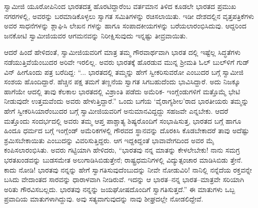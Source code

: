 ಸ್ವಾಮೀಜಿ ಯೂರೋಪಿನಿಂದ ಭಾರತದತ್ತ ಹೊರಟಿದ್ದಾರೆಂಬ ವರ್ತಮಾನ ತಿಳಿದ ಕೂಡಲೇ ಭಾರತದ ಪ್ರಮುಖ ನಗರಗಳಲ್ಲಿ, ಅವರನ್ನು ಬರಮಾಡಿಕೊಳ್ಳಲು ಸ್ವಾಗತ ಸಮಿತಿಗಳನ್ನು ರಚಿಸಲಾಯಿತು. ಇಡೀ ದೇಶದಲ್ಲಿನ ವೃತ್ತಪತ್ರಿಕೆಗಳು ಅವರ ಸಾಧನೆಗಳನ್ನು ಶ್ಲಾಘಿಸಿ ಲೇಖನ ಗಳನ್ನು ಹಾಗೂ ಸಂಪಾದಕೀಯಗಳನ್ನು ಬರೆಯಲಾರಂಭಿಸಿದುವು. ಆದ್ದರಿಂದ ಜನಕೋಟಿ ಸ್ವಾಮೀಜಿಯವರ ಆಗಮನವನ್ನು ನಿರೀಕ್ಷಿಸುವುದು ಇನ್ನಷ್ಟು ತೀವ್ರವಾಯಿತು.

ಆದರೆ ಹಿಂದೆ ಹೇಳಿದಂತೆ, ಸ್ವಾಮೀಜಿಯವರಿಗೆ ಮಾತ್ರ ತಮ್ಮ ಗೌರವಾರ್ಥವಾಗಿ ಭಾರತ ದಲ್ಲಿ ಇಷ್ಟೆಲ್ಲ ಸಿದ್ಧತೆಗಳು ನಡೆಯುತ್ತಿವೆಯೆಂಬುದರ ಅರಿವೇ ಇರಲಿಲ್ಲ. ಅವರು ಭಾರತಕ್ಕೆ ಹೊರಡುವ ಮುನ್ನ ಶ್ರೀಮತಿ ಓಲ್ ಬುಲ್​ಳಿಗೆ ಗುಡ್​ವಿನ್ ಹೀಗೊಂದು ಪತ್ರ ಬರೆದಿದ್ದ: “... ಭಾರತದಲ್ಲಿ ತಮ್ಮನ್ನು ಹೇಗೆ ಸ್ವೀಕರಿಸುವರೋ ಎಂಬುದರ ಬಗ್ಗೆ ಸ್ವಾಮೀಜಿ ಸಂಶಯ ಹೊಂದಿದ್ದಾರೆ. ಹೆಚ್ಚಿನ ಪಕ್ಷ ತಮಗೆ ತಣ್ಣನೆಯ ಸ್ವಾಗತ ಸಿಗಬಹುದೆಂದು ಭಾವಿಸಿದ್ದಾರೆ. ಅದು ನಿಜಕ್ಕೂ ಹಾಗೆಯೇ ಆದಲ್ಲಿ ತಾವು ಕೆಲಕಾಲ ಭಾರತದಲ್ಲಿ ವಿಶ್ರಾಂತಿ ಪಡೆದು ಅಮೆರಿಕ- ಇಂಗ್ಲೆಂಡುಗಳಿಗೆ ಮತ್ತೊಮ್ಮೆ ಭೇಟಿ ನೀಡುವುದೇ ಉತ್ತಮವೆಂದು ಅವರು ಹೇಳುತ್ತಿದ್ದಾರೆ.” ಒಂದು ಬಗೆಯ ‘ವೈರಾಗ್ಯಶೀಲ’ರಾದ ಭಾರತೀಯರು ತಮ್ಮನ್ನು ಹೇಗೆ ಸ್ವೀಕರಿಸಿಯಾರೆಂಬುದರ ಬಗ್ಗೆ ಸ್ವಾಮೀಜಿಯವರಿಗೆ ಅನುಮಾನವಿದ್ದದ್ದು ಸಹಜವೇ ಎನ್ನಬೇಕು. ಆದರೆ ಮತ್ತೊಂದು ಸಂದರ್ಭದಲ್ಲಿ ಅವರು ತಮ್ಮ ಆಪ್ತ ಪಾಶ್ಚಾತ್ಯ ಶಿಷ್ಯರೊಂದಿಗೆ ಸಂಭಾಷಿಸುತ್ತ, ಭಾರತದ ಬಗ್ಗೆ ಹಾಗೂ ಹಿಂದೂ ಧರ್ಮದ ಬಗ್ಗೆ ಇಂಗ್ಲೆಂಡ್ ಅಮೆರಿಕಗಳಲ್ಲಿ ಗೌರವದ ಸ್ಥಾನವನ್ನು ದೊರಕಿಸಿ ಕೊಡಬೇಕಾದರೆ ತಾವು ಅದೆಷ್ಟು ಶ್ರಮಿಸಬೇಕಾಯಿತು ಎಂಬುದನ್ನು ವಿವರಿಸುತ್ತಿದ್ದರು. ಆಗ ಇದ್ದಕಿದ್ದಂತೆ ಭಾವಾವೇಗದಿಂದ ಅವರ ಮೈ ಕಂಪಿಸಲಾರಂಭಿಸಿತು. ಅವರು ಗಟ್ಟಿಯಾಗಿ ಹೇಳಿದರು, “ಭಾರತವು ನನ್ನ ಮಾತನ್ನು ಕೇಳಲೇಬೇಕು! ನಾನು ಸಮಗ್ರ ಭರತಖಂಡವನ್ನು ಬುಡಸಮೇತ ಅಲುಗಾಡಿಸಿಬಿಡುತ್ತೇನೆ; ರಾಷ್ಟ್ರಧಮನಿಗಳಲ್ಲಿ ವಿದ್ಯುತ್ಸಂಚಾರ ಮಾಡಿಸಿಬಿಡು ತ್ತೇನೆ. ಕಾದು ನೋಡಿ! ಭಾರತವು ನನ್ನನ್ನು ಹೇಗೆ ಸ್ವಾಗತಿಸುವುದೆಂಬುದನ್ನು ನೀವೇ ನೋಡುವಿರಿ! ನಾನಿಲ್ಲಿ ನನ್ನೆದೆಯ ರಕ್ತವನ್ನೇ ಬಸಿದು ವೇದಾಂತದ ಸಾರವನ್ನು ಧಾರಾಳವಾಗಿ ನೀಡಿರುವೆ. ಇದನ್ನು ಆ ಭಾರತ–ನನ್ನ ಭಾರತ–ಮಾತ್ರವೇ ಸರಿಯಾಗಿ ಅರಿತು ಗೌರವಿಸಬಲ್ಲದು. ಭಾರತವು ನನ್ನನ್ನು ಜಯಘೋಷದೊಂದಿಗೆ ಸ್ವಾಗತಿಸುತ್ತದೆ.” ಈ ಮಾತುಗಳು ಒಬ್ಬ ಪ್ರವಾದಿಯ ಮಾತುಗಳಾಗಿದ್ದುವು. ಅವು ಸತ್ಯವಾಗುವುದನ್ನು ನಾವು ಶೀಘ್ರದಲ್ಲೇ ನೋಡಲಿದ್ದೇವೆ.

